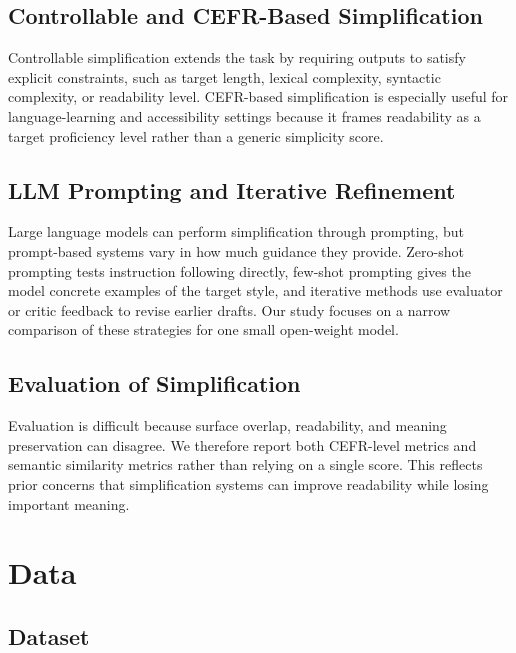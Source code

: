 \documentclass[11pt]{article}
\begin{document}
\subsection{Controllable and CEFR-Based Simplification}

Controllable simplification extends the task by requiring outputs to satisfy explicit constraints, such as target length, lexical complexity, syntactic complexity, or readability level. CEFR-based simplification is especially useful for language-learning and accessibility settings because it frames readability as a target proficiency level rather than a generic simplicity score.

\subsection{LLM Prompting and Iterative Refinement}

Large language models can perform simplification through prompting, but prompt-based systems vary in how much guidance they provide. Zero-shot prompting tests instruction following directly, few-shot prompting gives the model concrete examples of the target style, and iterative methods use evaluator or critic feedback to revise earlier drafts. Our study focuses on a narrow comparison of these strategies for one small open-weight model.

\subsection{Evaluation of Simplification}

Evaluation is difficult because surface overlap, readability, and meaning preservation can disagree. We therefore report both CEFR-level metrics and semantic similarity metrics rather than relying on a single score. This reflects prior concerns that simplification systems can improve readability while losing important meaning.

\section{Data}

\subsection{Dataset}
\end{document}
